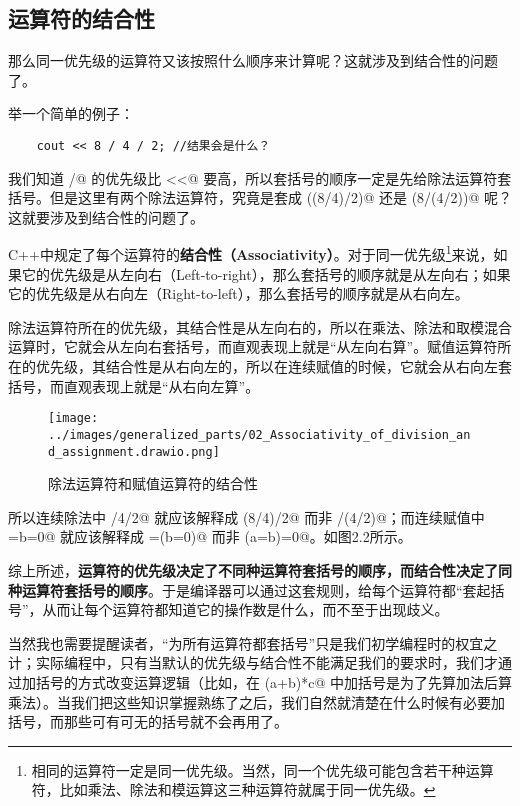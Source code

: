 \subsection*{运算符的结合性}
那么同一优先级的运算符又该按照什么顺序来计算呢？这就涉及到结合性的问题了。\par
举一个简单的例子：
\begin{lstlisting}
    cout << 8 / 4 / 2; //结果会是什么？
\end{lstlisting}
我们知道 \lstinline@/@ 的优先级比 \lstinline@<<@ 要高，所以套括号的顺序一定是先给除法运算符套括号。但是这里有两个除法运算符，究竟是套成 \lstinline@((8/4)/2)@ 还是 \lstinline@(8/(4/2))@ 呢？这就要涉及到结合性的问题了。\par
C++中规定了每个运算符的\textbf{结合性（Associativity）}。对于同一优先级\footnote{相同的运算符一定是同一优先级。当然，同一个优先级可能包含若干种运算符，比如乘法、除法和模运算这三种运算符就属于同一优先级。}来说，如果它的优先级是从左向右（Left-to-right），那么套括号的顺序就是从左向右；如果它的优先级是从右向左（Right-to-left），那么套括号的顺序就是从右向左。\par
除法运算符所在的优先级，其结合性是从左向右的，所以在乘法、除法和取模混合运算时，它就会从左向右套括号，而直观表现上就是``从左向右算''。赋值运算符所在的优先级，其结合性是从右向左的，所以在连续赋值的时候，它就会从右向左套括号，而直观表现上就是``从右向左算''。\par
\begin{figure}[htbp]
    \centering
    \texttt{[image: ../images/generalized\_parts/02\_Associativity\_of\_division\_and\_assignment.drawio.png]}
    \caption{除法运算符和赋值运算符的结合性}
\end{figure}
所以连续除法中 /4/2@ 就应该解释成 \lstinline@(8/4)/2@ 而非 /(4/2)@；而连续赋值中 \lstinline@a=b=0@ 就应该解释成 \lstinline@a=(b=0)@ 而非 \lstinline@(a=b)=0@。如图2.2所示。\par
综上所述，\textbf{运算符的优先级决定了不同种运算符套括号的顺序，而结合性决定了同种运算符套括号的顺序}。于是编译器可以通过这套规则，给每个运算符都``套起括号''，从而让每个运算符都知道它的操作数是什么，而不至于出现歧义。\par
当然我也需要提醒读者，``为所有运算符都套括号''只是我们初学编程时的权宜之计；实际编程中，只有当默认的优先级与结合性不能满足我们的要求时，我们才通过加括号的方式改变运算逻辑（比如，在 \lstinline@(a+b)*c@ 中加括号是为了先算加法后算乘法）。当我们把这些知识掌握熟练了之后，我们自然就清楚在什么时候有必要加括号，而那些可有可无的括号就不会再用了。\par
